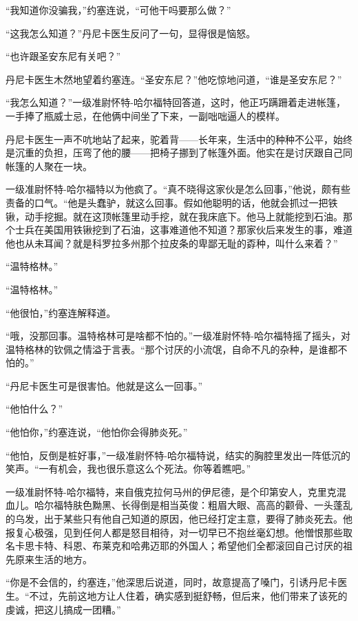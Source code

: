     “我知道你没骗我，”约塞连说，“可他干吗要那么做？”

    “这我怎么知道？”丹尼卡医生反问了一句，显得很是恼怒。

    “也许跟圣安东尼有关吧？”

    丹尼卡医生木然地望着约塞连。“圣安东尼？”他吃惊地问道，“谁是圣安东尼？”

    “我怎么知道？”一级准尉怀特-哈尔福特回答道，这时，他正巧蹒跚着走进帐篷，一手捧了瓶威士忌，在他俩中间坐了下来，一副咄咄逼人的模样。

    丹尼卡医生一声不吭地站了起来，驼着背——长年来，生活中的种种不公平，始终是沉重的负担，压弯了他的腰——把椅子挪到了帐篷外面。他实在是讨厌跟自己同帐篷的人聚在一块。

 


    一级准尉怀特-哈尔福特以为他疯了。“真不晓得这家伙是怎么回事，”他说，颇有些责备的口气。“他是头蠢驴，就这么回事。假如他聪明的话，他就会抓过一把铁锹，动手挖掘。就在这顶帐篷里动手挖，就在我床底下。他马上就能挖到石油。那个士兵在美国用铁锹挖到了石油，这事难道他不知道？那家伙后来发生的事，难道他也从未耳闻？就是科罗拉多州那个拉皮条的卑鄙无耻的孬种，叫什么来着？”

    “温特格林。”

    “温特格林。”

    “他很怕，”约塞连解释道。

    “哦，没那回事。温特格林可是啥都不怕的。”一级准尉怀特-哈尔福特摇了摇头，对温特格林的钦佩之情溢于言表。“那个讨厌的小流氓，自命不凡的杂种，是谁都不怕的。”

    “丹尼卡医生可是很害怕。他就是这么一回事。”

    “他怕什么？”

    “他怕你，”约塞连说，“他怕你会得肺炎死。”

    “他怕，反倒是桩好事，”一级准尉怀特-哈尔福特说，结实的胸腔里发出一阵低沉的笑声。“一有机会，我也很乐意这么个死法。你等着瞧吧。”

    一级准尉怀特-哈尔福特，来自俄克拉何马州的伊尼德，是个印第安人，克里克混血儿。哈尔福特肤色黝黑、长得倒是相当英俊：粗眉大眼、高高的颧骨、一头蓬乱的乌发，出于某些只有他自己知道的原因，他已经打定主意，要得了肺炎死去。他报复心极强，见到任何人都是怒目相待，对一切早已不抱丝毫幻想。他憎恨那些取名卡思卡特、科恩、布莱克和哈弗迈耶的外国人；希望他们全都滚回自己讨厌的祖先原来生活的地方。

 


    “你是不会信的，约塞连，”他深思后说道，同时，故意提高了嗓门，引诱丹尼卡医生。“不过，先前这地方让人住着，确实感到挺舒畅，但后来，他们带来了该死的虔诚，把这儿搞成一团糟。”

